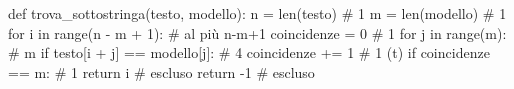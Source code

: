 \begin{unipdcode}[language=Python]
def trova_sottostringa(testo, modello):
    n = len(testo)                             # 1
    m = len(modello)                           # 1
    for i in range(n - m + 1):                 # al più n-m+1 
        coincidenze = 0                        # 1
        for j in range(m):                     # m 
            if testo[i + j] == modello[j]:     # 4
                coincidenze += 1               # 1 (t)
        if coincidenze == m:                   # 1
            return i                           # escluso
    return -1                                  # escluso
\end{unipdcode}
